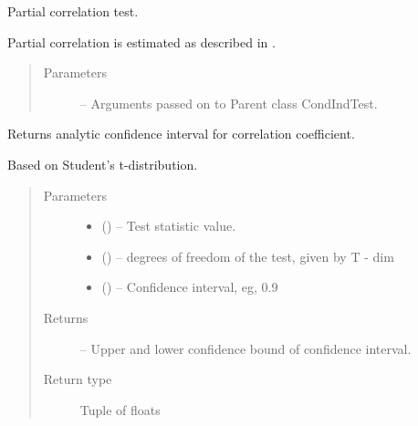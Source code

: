 \documentclass[letterpaper,10pt,english]{sphinxmanual}
\begin{document}
\begin{fulllineitems}
\label{\detokenize{index:tigramite.independence_tests.ParCorr}}
Partial correlation test.

Partial correlation is estimated as described in \sphinxfootnotemark[1].
\begin{quote}\begin{description}
\item[{Parameters}] \leavevmode
{} -- Arguments passed on to Parent class CondIndTest.

\end{description}\end{quote}

\begin{fulllineitems}
\label{\detokenize{index:tigramite.independence_tests.ParCorr.get_analytic_confidence}}
Returns analytic confidence interval for correlation coefficient.

Based on Student's t-distribution.
\begin{quote}\begin{description}
\item[{Parameters}] \leavevmode\begin{itemize}
\item {} 
 () -- Test statistic value.

\item {} 
 () -- degrees of freedom of the test, given by T - dim

\item {} 
 () -- Confidence interval, eg, 0.9

\end{itemize}

\item[{Returns}] \leavevmode
{} -- Upper and lower confidence bound of confidence interval.

\item[{Return type}] \leavevmode
Tuple of floats


\end{description}
\end{quote}
\end{fulllineitems}
\end{fulllineitems}
\end{document}
